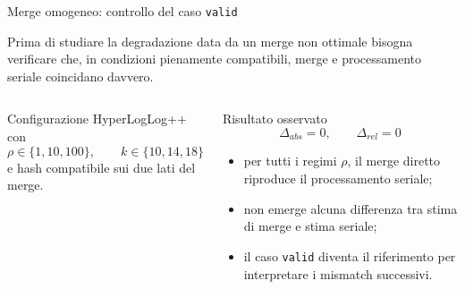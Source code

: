 \documentclass[aspectratio=169,11pt]{beamer}
\begin{document}
\begin{frame}{Merge omogeneo: controllo del caso \texttt{valid}}
  
  Prima di studiare la degradazione data da un merge non ottimale bisogna verificare che, in condizioni
  pienamente compatibili, merge e processamento seriale coincidano davvero.
  

  \begin{columns}[T,onlytextwidth]
      \begin{block}{Configurazione}
        \scriptsize
        HyperLogLog++ con
        \[
          \rho \in \{1,10,100\}, \qquad
          k \in \{10,14,18\}
        \]
        e hash compatibile sui due lati del merge.
      \end{block}
      \begin{block}{Risultato osservato}
        \scriptsize
        \[
          \Delta_{abs}=0, \qquad \Delta_{rel}=0
        \]

        \begin{itemize}
          \item per tutti i regimi \(\rho\), il merge diretto riproduce il
          processamento seriale;
          \item non emerge alcuna differenza tra stima di merge e stima seriale;
          \item il caso \texttt{valid} diventa il riferimento per interpretare i
          mismatch successivi.
        \end{itemize}
      \end{block}
  \end{columns}
\end{frame}
\end{document}
